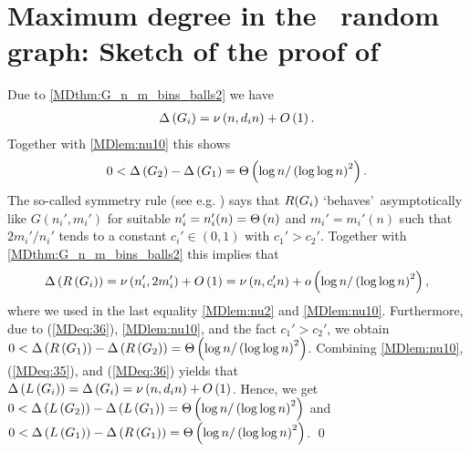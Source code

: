 \section[Maximum degree of the \ER\ random graph]{Maximum degree in the \ER\ random graph: Sketch of the proof of }\label{MDsec:proof_er}
Due to \ref{MDthm:G_n_m_bins_balls2} we have \whp\ 
\begin{align}\label{MDeq:35}
\Delta\left(G_i\right)=\nu\left(n, d_in\right)+O\left(1\right).
\end{align}
Together with \ref{MDlem:nu10} this shows \whp\
\begin{align*}
0<\Delta\left(G_2\right)-\Delta\left(G_1\right)=\Theta\left(\log n/\left(\log \log n\right)^2\right).
\end{align*}
The so-called symmetry rule (see e.g. \cite[Section 5.6]{JansonLuczakRucinski2000}) says that $R(G_i)$ \lq behaves\rq\ asymptotically like $G\left(n_i', m_i'\right)$ for suitable $n_i'=n_i'(n)=\Theta\left(n\right)$ and $m_i'=m_i'(n)$ such that $2m_i'/n_i'$ tends to a constant $c_i'\in (0,1)$ with $c_1'>c_2'$. Together with \ref{MDthm:G_n_m_bins_balls2} this implies that \whp\
\begin{align}\label{MDeq:36}
\Delta\left(R\left(G_i\right)\right)=\nu\left(n_i', 2m_i'\right)+O\left(1\right)=\nu\left(n, c_i'n\right)+o\left(\log n/\left(\log \log n\right)^2\right),
\end{align}
where we used in the last equality \ref{MDlem:nu2} and \ref{MDlem:nu10}. Furthermore, due to (\ref{MDeq:36}), \ref{MDlem:nu10}, and the fact $c_1'>c_2'$, we obtain \whp\ $0<\Delta\left(R\left(G_1\right)\right)-\Delta\left(R\left(G_2\right)\right)=\Theta\left(\log n/\left(\log \log n\right)^2\right)$. Combining \ref{MDlem:nu10}, (\ref{MDeq:35}), and (\ref{MDeq:36}) yields that \whp\ $\Delta\left(L\left(G_i\right)\right)=\Delta\left(G_i\right)=\nu\left(n, d_in\right)+O\left(1\right)$. Hence, we get \whp\ $0<\Delta\left(L\left(G_2\right)\right)-\Delta\left(L\left(G_1\right)\right)=\Theta\left(\log n/\left(\log \log n\right)^2\right)$ and $0<\Delta\left(L\left(G_1\right)\right)-\Delta\left(R\left(G_1\right)\right)=\Theta\left(\log n/\left(\log \log n\right)^2\right)$. \qed

